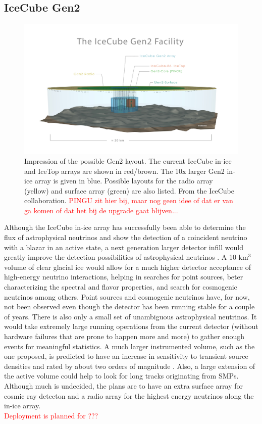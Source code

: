 \subsection{IceCube Gen2}
\begin{figure}[ht]
\centering
\includegraphics[width=\textwidth]{chapter5/img/gen2_structure.jpg}
\caption{Impression of the possible Gen2 layout. The current IceCube in-ice and IceTop arrays are shown in red/brown. The 10x larger Gen2 in-ice array is given in blue. Possible layouts for the radio array (yellow) and surface array (green) are also listed. From the IceCube collaboration. \textcolor{red}{PINGU zit hier bij, maar nog geen idee of dat er van ga komen of dat het bij de upgrade gaat blijven...}}
\label{fig:gen2}
\end{figure}

\noindent Although the IceCube in-ice array has successfully been able to determine the flux of astrophysical neutrinos and show the detection of a coincident neutrino with a blazar in an active state, a next generation larger detector infill would greatly improve the detection possibilities of astrophysical neutrinos \cite{Blaufuss:2015muc}. A 10 km$^3$ volume of clear glacial ice would allow for a much higher detector acceptance of high-energy neutrino interactions, helping in searches for point sources, beter characterizing the spectral and flavor properties, and search for cosmogenic neutrinos among others. Point sources and cosmogenic neutrinos have, for now, not been observed even though the detector has been running stable for a couple of years. There is also only a small set of unambiguous astrophysical neutrinos. It would take extremely large running operations from the current detector (without hardware failures that are prone to happen more and more) to gather enough events for meaningful statistics. A much larger instrumented volume, such as the one proposed, is predicted to have an increase in sensitivity to transient source densities and rated by about two orders of magnitude \cite{Ahlers:2014ioa}. Also, a large extension of the active volume could help to look for long tracks originating from SMPs. Although much is undecided, the plans are to have an extra surface array for cosmic ray detecton and a radio array for the highest energy neutrinos along the in-ice array.\\
\newline
\textcolor{red}{Deployment is planned for ???}

